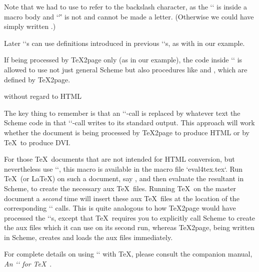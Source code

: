 \begintt
\ifx\shipout\UnDeFiNeD
\htmlonly


\def\spaceifnotempty{\eval{
\endtt
\begintts
(let ((x (ungroup (get-token))))
  (if (not (all-blanks? x))
      (begin (display (integer->char 92))
             (display "space"))
      0))
\endtt
\begintt
}}

\endhtmlonly
\fi
\endtt
Note that we had to use  to refer to the
backslash character, as the `\eval` is inside a macro body and ‘`\`’
is not and cannot be made a letter.
(Otherwise we could have simply written .)

Later `\eval`s can
use definitions introduced in previous `\eval`s,
as with  in our example.

If being processed by \TeX2page only (as in our example),
the code inside `\eval` is allowed to use not just general Scheme
but also procedures like
 and , which are defined by
\TeX2page.

 without regard to HTML

%
The key thing to remember is that
an `\eval`-call is replaced by whatever text the
Scheme code in that `\eval`-call writes to its
standard output.  This approach will work whether the
document is being processed by \TeX2page to produce HTML
or by \TeX\ to produce DVI.

For those \TeX\ documents that are not intended for HTML conversion, but
nevertheless use `\eval`, this macro is available in the macro file
`eval4tex.tex`.  Run \TeX\ (or \LaTeX) on such a document, say
, and then evaluate
the resultant  in Scheme, to create the
necessary aux \TeX\ files.  Running \TeX\ on the master document a {\em second}
time will
insert these aux \TeX\ files at the location of the corresponding `\eval`
calls.  This is quite analogous to how \TeX2page would have processed the
`\eval`s, except that \TeX\ requires you to explicitly call Scheme to
create the aux files which it can use on its second run, whereas
\TeX2page, being written in Scheme, creates and loads the aux files
immediately.

For complete details on using `\eval` with
\TeX, please consult the companion manual,
{\em An `\eval` for
\TeX}~\cite{eval4tex}.

